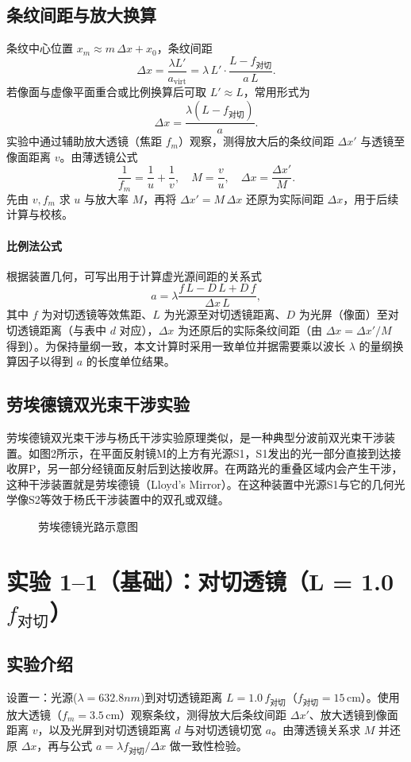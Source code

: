 \documentclass[12pt,a4paper]{article}
\begin{document}
\subsection*{条纹间距与放大换算}
条纹中心位置 $x_m \approx m\,\Delta x + x_0$，条纹间距
\[ \Delta x = \frac{\lambda L'}{a_{\text{virt}}} = \lambda\,L'\cdot\frac{L - f_{\text{对切}}}{a\,L}. \]
若像面与虚像平面重合或比例换算后可取 $L'\approx L$，常用形式为
\[ \Delta x = \frac{\lambda (L - f_{\text{对切}})}{a}. \]
实验中通过辅助放大透镜（焦距 $f_m$）观察，测得放大后的条纹间距 $\Delta x'$ 与透镜至像面距离 $v$。由薄透镜公式
\[ \frac{1}{f_m} = \frac{1}{u} + \frac{1}{v},\quad M = \frac{v}{u},\quad \Delta x = \frac{\Delta x'}{M}. \]
先由 $v,f_m$ 求 $u$ 与放大率 $M$，再将 $\Delta x'=M\,\Delta x$ 还原为实际间距 $\Delta x$，用于后续计算与校核。

\paragraph{比例法公式}
根据装置几何，可写出用于计算虚光源间距的关系式
\[
	a = \lambda  \frac{f\,L - D\,L + D\,f}{\Delta x\,L},
\]
其中 $f$ 为对切透镜等效焦距、$L$ 为光源至对切透镜距离、$D$ 为光屏（像面）至对切透镜距离（与表中 $d$ 对应），$\Delta x$ 为还原后的实际条纹间距（由 $\Delta x=\Delta x'/M$ 得到）。为保持量纲一致，本文计算时采用一致单位并据需要乘以波长 $\lambda$ 的量纲换算因子以得到 $a$ 的长度单位结果。

\subsection*{劳埃德镜双光束干涉实验}
劳埃德镜双光束干涉与杨氏干涉实验原理类似，是一种典型分波前双光束干涉装置。如图2所示，在平面反射镜M的上方有光源S1，S1发出的光一部分直接到达接收屏P，另一部分经镜面反射后到达接收屏。在两路光的重叠区域内会产生干涉，这种干涉装置就是劳埃德镜（Lloyd’s Mirror）。在这种装置中光源S1与它的几何光学像S2等效于杨氏干涉装置中的双孔或双缝。

\begin{figure}[h]
    \centering
    \caption{劳埃德镜光路示意图}
\end{figure}

\section{实验 1--1（基础）：对切透镜（L = 1.0\,$f_{\text{对切}}$）}
\subsection*{实验介绍}
设置一：光源($\lambda = 632.8 nm$)到对切透镜距离 $L=1.0\,f_{\text{对切}}$（$f_{\text{对切}}=15\,\mathrm{cm}$）。使用放大透镜（$f_m=3.5\,\mathrm{cm}$）观察条纹，测得放大后条纹间距 $\Delta x'$、放大透镜到像面距离 $v$，以及光屏到对切透镜距离 $d$ 与对切透镜切宽 $a$。由薄透镜关系求 $M$ 并还原 $\Delta x$，再与公式 $a = \lambda f_{\text{对切}}/\Delta x$ 做一致性检验。
\end{document}
